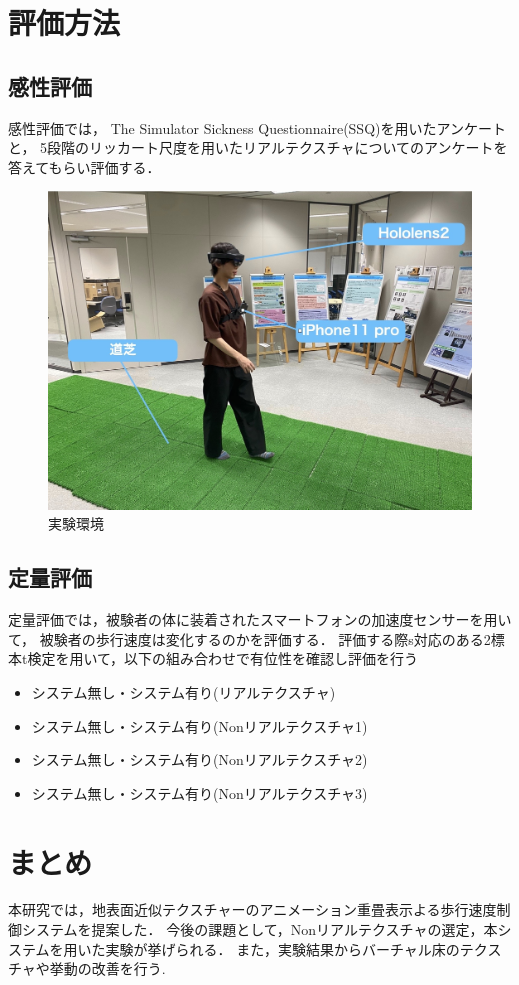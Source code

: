 \documentclass[dvipdfmx]{jsarticle}
\begin{document}
 \section{評価方法}
 
 \subsection{感性評価}
 感性評価では，
The Simulator Sickness Questionnaire(SSQ)を用いたアンケートと，
5段階のリッカート尺度を用いたリアルテクスチャについてのアンケートを答えてもらい評価する．
 
 
 
 \begin{figure}[t]
    \centering
    \includegraphics[width=0.8\linewidth]{fig/enviroment.jpeg}
    \caption{実験環境}
    \label{fig:kokaton}
\end{figure}

\subsection{定量評価}
 定量評価では，被験者の体に装着されたスマートフォンの加速度センサーを用いて，
 被験者の歩行速度は変化するのかを評価する．
評価する際s対応のある2標本t検定を用いて，以下の組み合わせで有位性を確認し評価を行う
\begin{itemize}
    \item システム無し・システム有り(リアルテクスチャ)
    \item システム無し・システム有り(Nonリアルテクスチャ1)
    \item システム無し・システム有り(Nonリアルテクスチャ2)
    \item システム無し・システム有り(Nonリアルテクスチャ3)
\end{itemize}
\section{まとめ}
本研究では，地表面近似テクスチャーのアニメーション重畳表示よる歩行速度制御システムを提案した．
今後の課題として，Nonリアルテクスチャの選定，本システムを用いた実験が挙げられる．
また，実験結果からバーチャル床のテクスチャや挙動の改善を行う.


\end{document}
